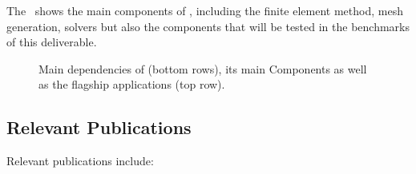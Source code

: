 The~ shows the main components of \Feelpp, including the finite element method, mesh generation, solvers but also the components that will be tested in the benchmarks of this deliverable.

\begin{figure}
        
        \caption{Main dependencies of \Feelpp(bottom rows), its main Components as well as the flagship applications (top row).}
        \label{fig:Feelpp:components}
\end{figure}

\subsection{Relevant Publications}
\label{sec:Feelpp:publications}
Relevant publications include:

